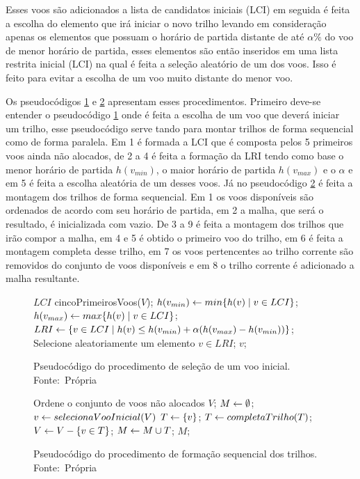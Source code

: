Esses voos são adicionados a lista de candidatos iniciais (LCI) em seguida é
feita a escolha do elemento que irá iniciar o novo trilho levando em
consideração apenas os elementos que possuam o horário de partida distante de
até $\alpha \%$ do voo de menor horário de partida, esses elementos são então
inseridos em uma lista restrita inicial (LCI) na qual é feita a seleção
aleatório de um dos voos. Isso é feito para evitar a escolha de um voo muito
distante do menor voo.

Os pseudocódigos \ref{alg:selectinit} e \ref{alg:formseq} apresentam esses
procedimentos. Primeiro deve-se entender o pseudocódigo \ref{alg:selectinit}
onde é feita a escolha de um voo que deverá iniciar um trilho, esse
pseudocódigo serve tando para montar trilhos de forma sequencial como de forma
paralela. Em 1 é formada a LCI que é composta pelos 5 primeiros voos ainda não
alocados, de 2 a 4 é feita a formação da LRI tendo como base o menor horário de
partida $h(v_{min})$, o maior horário de partida $h(v_{max})$ e o $\alpha$ e em
5 é feita a escolha aleatória de um desses voos. Já no pseudocódigo
\ref{alg:formseq} é feita a montagem dos trilhos de forma sequencial. Em 1 os
voos disponíveis são ordenados de acordo com seu horário de partida, em 2 a
malha, que será o resultado, é inicializada com vazio. De 3 a 9 é feita a
montagem dos trilhos que irão compor a malha, em 4 e 5 é obtido o primeiro voo
do trilho, em 6 é feita a montagem completa desse trilho, em 7 os voos
pertencentes ao trilho corrente são removidos do conjunto de voos disponíveis e
em 8 o trilho corrente é adicionado a malha resultante.

 \begin{figure}[h]
\caption{Pseudocódigo do procedimento de seleção de um voo inicial. \newline
\mbox{Fonte: Própria}}\label{alg:selectinit}
\begin{programma}

\STATE $LCI$ \GETS cincoPrimeirosVoos($V$);
\STATE $h(v_{min}) \leftarrow min\{h(v) \mid v \in LCI\}$;
\STATE $h(v_{max}) \leftarrow max\{h(v) \mid v \in LCI\}$;
\STATE $LRI \leftarrow \{v \in LCI \mid h(v) \leq h(v_{min}) + \alpha(h(v_{max}) -
h(v_{min}))\}$;
\STATE Selecione aleatoriamente um elemento $v \in LRI$;
\STATE\RETURN $v$;
\ENDALGORITHM
\end{programma}
\end{figure}

\begin{figure}[h]
\caption{Pseudocódigo do procedimento de formação sequencial dos trilhos.
\newline
\mbox{Fonte: Própria}}\label{alg:formseq}
\begin{programma}

\STATE Ordene o conjunto de voos não alocados $V$;
\STATE $M \leftarrow \emptyset$;
\STATE $v \leftarrow selecionaVooInicial(V)$
\STATE $T \leftarrow \{v\}$;
\STATE $T \leftarrow completaTrilho(T)$;
\STATE $V \leftarrow V - \{v \in T\}$;
\STATE $M \leftarrow M \cup T$;
\ENDWHILE
\STATE\RETURN $M$;

\ENDALGORITHM
\end{programma}
\end{figure}


